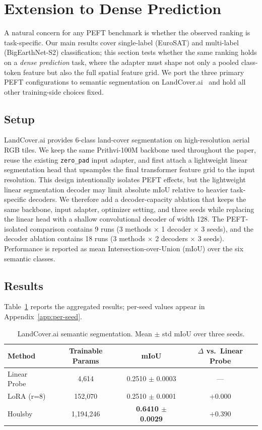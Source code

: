 \section{Extension to Dense Prediction}
\label{sec:segmentation}

A natural concern for any PEFT benchmark is whether the observed ranking is task-specific. Our main results cover single-label (EuroSAT) and multi-label (BigEarthNet-S2) classification; this section tests whether the same ranking holds on a \emph{dense prediction} task, where the adapter must shape not only a pooled class-token feature but also the full spatial feature grid. We port the three primary PEFT configurations to semantic segmentation on LandCover.ai~\cite{boguszewski2021landcoverai} and hold all other training-side choices fixed.

\subsection{Setup}

LandCover.ai provides 6-class land-cover segmentation on high-resolution aerial RGB tiles. We keep the same Prithvi-100M backbone used throughout the paper, reuse the existing \texttt{zero\_pad} input adapter, and first attach a lightweight linear segmentation head that upsamples the final transformer feature grid to the input resolution. This design intentionally isolates PEFT effects, but the lightweight linear segmentation decoder may limit absolute mIoU relative to heavier task-specific decoders. We therefore add a decoder-capacity ablation that keeps the same backbone, input adapter, optimizer setting, and three seeds while replacing the linear head with a shallow convolutional decoder of width 128. The PEFT-isolated comparison contains 9 runs (3 methods $\times$ 1 decoder $\times$ 3 seeds), and the decoder ablation contains 18 runs (3 methods $\times$ 2 decoders $\times$ 3 seeds). Performance is reported as mean Intersection-over-Union (mIoU) over the six semantic classes.

\subsection{Results}

Table~\ref{tab:landcoverai-seg} reports the aggregated results; per-seed values appear in Appendix~\ref{app:per-seed}.

\begin{table}[h]
\centering
\small
\caption{LandCover.ai semantic segmentation. Mean $\pm$ std mIoU over three seeds.}
\label{tab:landcoverai-seg}
\begin{tabular}{lccc}
\toprule
Method & Trainable Params & mIoU & $\Delta$ vs.\ Linear Probe \\
\midrule
Linear Probe & 4{,}614       & 0.2510 $\pm$ 0.0003 & --- \\
LoRA (r=8)   & 152{,}070     & 0.2510 $\pm$ 0.0001 & $+0.000$ \\
Houlsby      & 1{,}194{,}246 & \textbf{0.6410 $\pm$ 0.0029} & $\mathbf{+0.390}$ \\
\bottomrule
\end{tabular}
\end{table}

